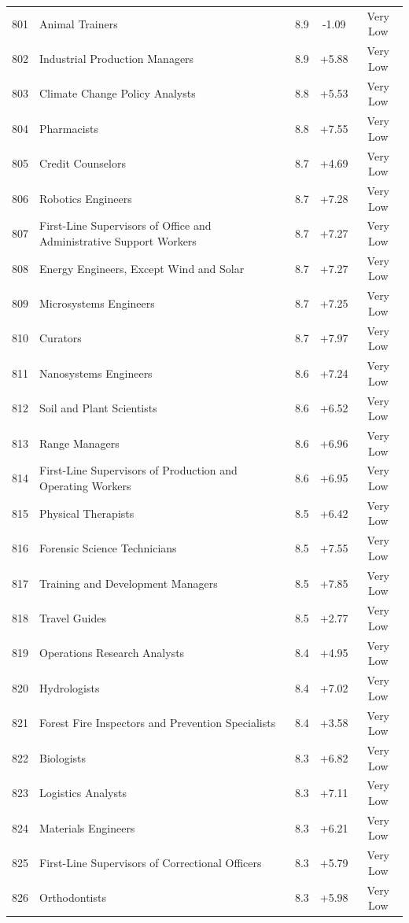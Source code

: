 {\begin{longtable}{rp{7cm}ccc}
801 & Animal Trainers & 8.9 & -1.09 & Very Low \\
802 & Industrial Production Managers & 8.9 & +5.88 & Very Low \\
803 & Climate Change Policy Analysts & 8.8 & +5.53 & Very Low \\
804 & Pharmacists & 8.8 & +7.55 & Very Low \\
805 & Credit Counselors & 8.7 & +4.69 & Very Low \\
806 & Robotics Engineers & 8.7 & +7.28 & Very Low \\
807 & First-Line Supervisors of Office and Administrative Support Workers & 8.7 & +7.27 & Very Low \\
808 & Energy Engineers, Except Wind and Solar & 8.7 & +7.27 & Very Low \\
809 & Microsystems Engineers & 8.7 & +7.25 & Very Low \\
810 & Curators & 8.7 & +7.97 & Very Low \\
811 & Nanosystems Engineers & 8.6 & +7.24 & Very Low \\
812 & Soil and Plant Scientists & 8.6 & +6.52 & Very Low \\
813 & Range Managers & 8.6 & +6.96 & Very Low \\
814 & First-Line Supervisors of Production and Operating Workers & 8.6 & +6.95 & Very Low \\
815 & Physical Therapists & 8.5 & +6.42 & Very Low \\
816 & Forensic Science Technicians & 8.5 & +7.55 & Very Low \\
817 & Training and Development Managers & 8.5 & +7.85 & Very Low \\
818 & Travel Guides & 8.5 & +2.77 & Very Low \\
819 & Operations Research Analysts & 8.4 & +4.95 & Very Low \\
820 & Hydrologists & 8.4 & +7.02 & Very Low \\
821 & Forest Fire Inspectors and Prevention Specialists & 8.4 & +3.58 & Very Low \\
822 & Biologists & 8.3 & +6.82 & Very Low \\
823 & Logistics Analysts & 8.3 & +7.11 & Very Low \\
824 & Materials Engineers & 8.3 & +6.21 & Very Low \\
825 & First-Line Supervisors of Correctional Officers & 8.3 & +5.79 & Very Low \\
826 & Orthodontists & 8.3 & +5.98 & Very Low \\

\end{longtable}}
